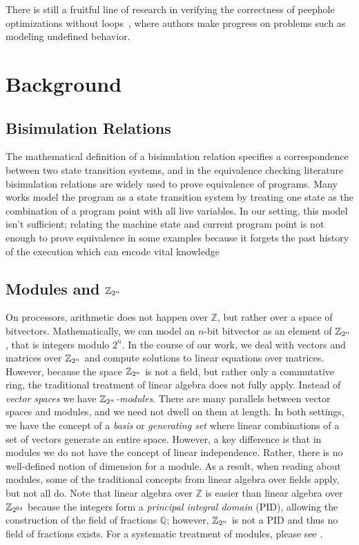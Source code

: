 There is still a fruitful line of research in verifying the
correctness of peephole optimizations without loops~\cite{Lopes2015},
where authors make progress on problems such as modeling undefined
behavior.

\section{Background}

\subsection{Bisimulation Relations}

The mathematical definition of a bisimulation relation specifies
a correspondence between two state transition systems, and in the
equivalence checking literature bisimulation relations are widely
used to prove equivalence of programs. Many works model the program as
a state transition system by treating one state as the combination of
a program point with all live variables. In our setting, this model
isn't sufficient; relating the machine state and current program point
is not enough to prove equivalence in some examples because it forgets
the past history of the execution which can encode vital knowledge

\subsection{Modules and $\mathbb{Z}_{2^{n}}$}

On processors, arithmetic does not happen over $\mathbb{Z}$, but
rather over a space of bitvectors. Mathematically, we can model
an $n$-bit bitvector as an element of $\mathbb{Z}_{2^{n}}$, that is integers
modulo $2^n$. In the course of our work, we deal with vectors and
matrices over $\mathbb{Z}_{2^{n}}$ and compute solutions to linear equations over
matrices. However, because the space $\mathbb{Z}_{2^{n}}$ is not a field, but
rather only a commutative ring, the traditional treatment of linear
algebra does not fully apply. Instead of \emph{vector spaces} we
have \emph{$\mathbb{Z}_{2^{n}}$-modules}. There are many parallels between vector
spaces and modules, and we need not dwell on them at length. In both
settings, we have the concept of a \emph{basis} or \emph{generating
set} where linear combinations of a set of vectors generate an
entire space. However, a key difference is that in modules we do
not have the concept of linear independence. Rather, there is no
well-defined notion of dimension for a module. As a result, when
reading about modules, some of the traditional concepts from linear
algebra over fields apply, but not all do. Note that linear algebra
over $\mathbb{Z}$ is easier than linear algebra over $\mathbb{Z}_{2^{64}}$ because
the integers form a \emph{principal integral domain} (PID), allowing
the construction of the field of fractions $\mathbb{Q}$; however,
$\mathbb{Z}_{2^{n}}$ is not a PID and thus no field of fractions exists. For a
systematic treatment of modules, please see .


